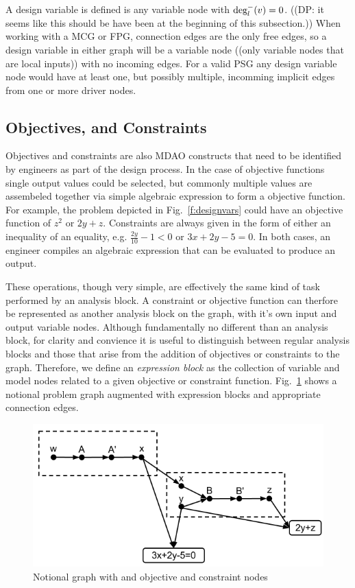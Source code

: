 	A design variable is defined is any variable node with $\textrm{deg}_l^-(v)=0$. ((DP: it seems like this should be have been at the beginning of this subsection.)) 
	When working with a MCG or FPG, connection edges are the only free edges, so a design 
	variable in either graph will be a variable node ((only variable nodes that are local inputs)) with no incoming edges. For a valid PSG 
	any design variable node would have at least one, but possibly multiple, incomming 
	implicit edges from one or more driver nodes. 

\subsection{Objectives, and Constraints}
	\label{ss:objectives and constraints}
	Objectives and constraints are also MDAO constructs that need to be identified by engineers 
	as part of the design process. In the case of objective functions single output values 
	could be selected, but commonly multiple values are assembeled together via simple 
	algebraic expression to form a objective function. For example, the problem depicted in 
	Fig.~\ref{f:designvars} could have an objective function of $z^2$ or $2y + z$. Constraints are 
	always given in the form of either an inequality of an equality, e.g. 
	$\frac{2y}{10}-1<0$ or $3x+2y - 5=0$. In both cases, an engineer compiles an
	algebraic expression that can be evaluated to produce an output. 

	These operations, though very simple, are effectively the same kind of task 
	performed by an analysis block. A constraint or objective function can therfore 
	be represented as another analysis block on the graph, with it's own input and 
	output variable nodes. Although fundamentally no different than an analysis block, 
	for clarity and convience it is useful to distinguish between regular analysis 
	blocks and those that arise from the addition of objectives or constraints to 
	the graph. Therefore, we define an \emph{expression block} as the collection of variable and model 
	nodes related to a given objective or constraint function. Fig.~\ref{f:obj-cons}
	shows a notional problem graph augmented with expression blocks and appropriate 
	connection edges. 
	\begin{figure}[htb!]
	  \begin{center}
		\includegraphics[width=.6\textwidth]{images/obj_const_graph}
	  \end{center}
	  \caption{Notional graph with and objective and constraint nodes \label{f:obj-cons}}
	\end{figure}

